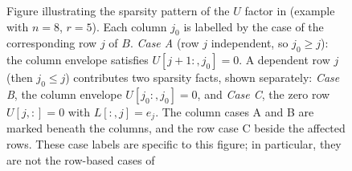 \documentclass[10pt,twoside]{siamart1116}
\numberwithin{theorem}{section}
\providecommand{\DIFadd}[1]{{\protect\color{blue} \sf #1}} %
\providecommand{\DIFaddbegin}{} %
\providecommand{\DIFaddFL}[1]{\DIFadd{#1}} %
\begin{document}
\DIFaddbegin \begin{figure}[htbp]
  \centering
  
  \caption{\DIFaddFL{Figure illustrating the sparsity pattern of the $U$ factor in } \DIFaddFL{(example with $n=8$, $r=5$). Each column $j_0$ is labelled by the case of the corresponding row $j$ of $B$. \emph{Case A} (row $j$ independent, so $j_0 \ge j$): the column envelope satisfies $U[j+1:,j_0]=0$. A dependent row $j$ (then $j_0 \le j$) contributes two sparsity facts, shown separately: \emph{Case B}, the column envelope $U[j_0:,j_0]=0$, and \emph{Case C}, the zero row $U[j,:]=0$ with $L[:,j]=e_j$. The column cases A and B are marked beneath the columns, and the row case C beside the affected rows. These case labels are specific to this figure; in particular, they are not the row-based cases of }\Cref{fig:sparsity}\DIFaddFL{.}}
  \label{fig:unit_lower_sparsity}
\end{figure}
\end{document}
